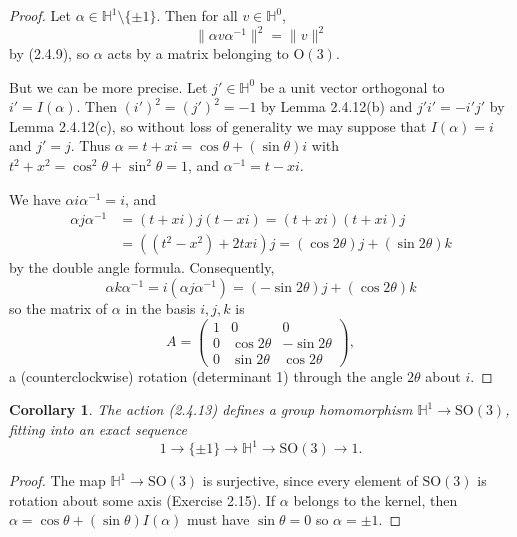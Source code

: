 \documentclass{article}
\newtheorem{corollary}[theorem]{Corollary}
\theoremstyle{definition}
\begin{document}
\begin{proof}
Let $\alpha \in \mathbb{H}^1 \setminus \{\pm 1\}$. Then for all $v \in \mathbb{H}^0$,
$$\|\alpha v \alpha^{-1}\|^2 = \|v\|^2$$
by (2.4.9), so $\alpha$ acts by a matrix belonging to $\mathrm{O}(3)$.

But we can be more precise. Let $j' \in \mathbb{H}^0$ be a unit vector orthogonal to $i' = I(\alpha)$. Then $(i')^2 = (j')^2 = -1$ by Lemma 2.4.12(b) and $j'i' = -i'j'$ by Lemma 2.4.12(c), so without loss of generality we may suppose that $I(\alpha) = i$ and $j' = j$. Thus $\alpha = t + xi = \cos\theta + (\sin\theta)i$ with $t^2 + x^2 = \cos^2\theta + \sin^2\theta = 1$, and $\alpha^{-1} = t - xi$.

We have $\alpha i \alpha^{-1} = i$, and
\begin{equation}
\begin{aligned}
\alpha j \alpha^{-1} &= (t + xi)j(t - xi) = (t + xi)(t + xi)j \\
&= ((t^2 - x^2) + 2txi)j = (\cos 2\theta)j + (\sin 2\theta)k
\end{aligned} \tag{2.4.19}
\end{equation}
by the double angle formula. Consequently,
$$\alpha k \alpha^{-1} = i(\alpha j \alpha^{-1}) = (-\sin 2\theta)j + (\cos 2\theta)k$$
so the matrix of $\alpha$ in the basis $i, j, k$ is
\begin{equation}
A = \begin{pmatrix}
1 & 0 & 0 \\
0 & \cos 2\theta & -\sin 2\theta \\
0 & \sin 2\theta & \cos 2\theta
\end{pmatrix}, \tag{2.4.20}
\end{equation}
a (counterclockwise) rotation (determinant 1) through the angle $2\theta$ about $i$.
\end{proof}

\begin{corollary}
The action (2.4.13) defines a group homomorphism $\mathbb{H}^1 \to \mathrm{SO}(3)$, fitting into an exact sequence
$$1 \to \{\pm 1\} \to \mathbb{H}^1 \to \mathrm{SO}(3) \to 1.$$
\end{corollary}

\begin{proof}
The map $\mathbb{H}^1 \rightarrow \mathrm{SO}(3)$ is surjective, since every element of $\mathrm{SO}(3)$ is rotation about some axis (Exercise 2.15). If $\alpha$ belongs to the kernel, then $\alpha = \cos \theta + (\sin \theta)I(\alpha)$ must have $\sin \theta = 0$ so $\alpha = \pm 1$.
\end{proof}
\end{document}
